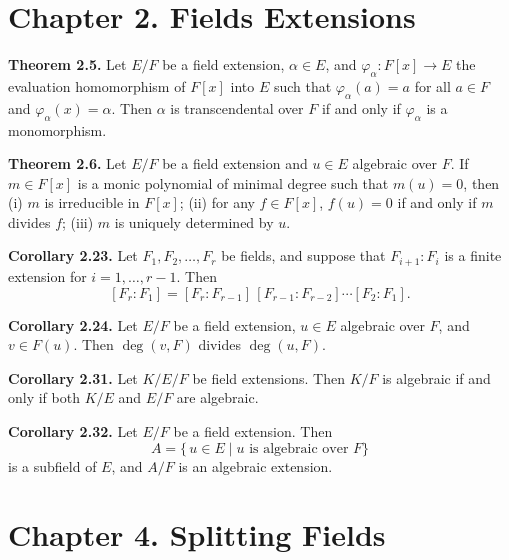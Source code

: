 \documentclass{article}
\newenvironment{theoremx}[1]{\noindent\textbf{Theorem #1.} }{\par}
\newenvironment{corollaryx}[1]{\noindent\textbf{Corollary #1.} }{\par}
\begin{document}
\section*{Chapter 2. Fields Extensions}

\begin{theoremx}{2.5}
Let $E/F$ be a field extension, $\alpha \in E$, and $\varphi_\alpha: F[x] \to E$ the evaluation homomorphism of $F[x]$ into $E$ such that $\varphi_\alpha(a) = a$ for all $a \in F$ and $\varphi_\alpha(x) = \alpha$.  Then $\alpha$ is transcendental over $F$ if and only if $\varphi_\alpha$ is a monomorphism.
\end{theoremx}

\begin{theoremx}{2.6}
Let $E/F$ be a field extension and $u\in E$ algebraic over $F$.  If $m \in F[x]$ is a monic polynomial of minimal degree such that $m(u) = 0$, then 
(i) $m$ is irreducible in $F[x]$; 
(ii) for any $f \in F[x]$, $f(u) = 0$ if and only if $m$ divides $f$; 
(iii) $m$ is uniquely determined by $u$.
\end{theoremx}

\begin{corollaryx}{2.23}
Let $F_1,F_2,\dots,F_r$ be fields, and suppose that $F_{i+1}:F_i$ is a finite extension for $i=1,\dots,r-1$.  Then 
\[
  [F_r:F_1] = [F_r:F_{r-1}]\,[F_{r-1}:F_{r-2}] \cdots [F_2:F_1].
\]
\end{corollaryx}

\begin{corollaryx}{2.24}
Let $E/F$ be a field extension, $u\in E$ algebraic over $F$, and $v\in F(u)$.  Then $\deg(v,F)$ divides $\deg(u,F)$.
\end{corollaryx}

\begin{corollaryx}{2.31}
Let $K/E/F$ be field extensions.  Then $K/F$ is algebraic if and only if both $K/E$ and $E/F$ are algebraic.
\end{corollaryx}

\begin{corollaryx}{2.32}
Let $E/F$ be a field extension.  Then 
\[
  A = \{\,u \in E \mid u \text{ is algebraic over }F\}
\]
is a subfield of $E$, and $A/F$ is an algebraic extension.
\end{corollaryx}


\section*{Chapter 4. Splitting Fields}
\end{document}
